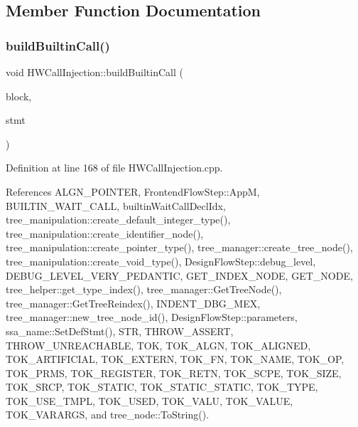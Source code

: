 \subsection{Member Function Documentation}
\mbox{\label{classHWCallInjection_a384a02ea581f0406948fe6823fe35b8a}} 
\subsubsection{\texorpdfstring{build\+Builtin\+Call()}{buildBuiltinCall()}}
{\footnotesize\ttfamily void H\+W\+Call\+Injection\+::build\+Builtin\+Call (\begin{DoxyParamCaption}\item[{const bloc\+Ref}]{block,  }\item[{const \hyperlink{tree__node_8hpp_a6ee377554d1c4871ad66a337eaa67fd5}{tree\+\_\+node\+Ref}}]{stmt }\end{DoxyParamCaption})\hspace{0.3cm}{\ttfamily [private]}}



Definition at line 168 of file H\+W\+Call\+Injection.\+cpp.



References A\+L\+G\+N\+\_\+\+P\+O\+I\+N\+T\+ER, Frontend\+Flow\+Step\+::\+AppM, B\+U\+I\+L\+T\+I\+N\+\_\+\+W\+A\+I\+T\+\_\+\+C\+A\+LL, builtin\+Wait\+Call\+Decl\+Idx, tree\+\_\+manipulation\+::create\+\_\+default\+\_\+integer\+\_\+type(), tree\+\_\+manipulation\+::create\+\_\+identifier\+\_\+node(), tree\+\_\+manipulation\+::create\+\_\+pointer\+\_\+type(), tree\+\_\+manager\+::create\+\_\+tree\+\_\+node(), tree\+\_\+manipulation\+::create\+\_\+void\+\_\+type(), Design\+Flow\+Step\+::debug\+\_\+level, D\+E\+B\+U\+G\+\_\+\+L\+E\+V\+E\+L\+\_\+\+V\+E\+R\+Y\+\_\+\+P\+E\+D\+A\+N\+T\+IC, G\+E\+T\+\_\+\+I\+N\+D\+E\+X\+\_\+\+N\+O\+DE, G\+E\+T\+\_\+\+N\+O\+DE, tree\+\_\+helper\+::get\+\_\+type\+\_\+index(), tree\+\_\+manager\+::\+Get\+Tree\+Node(), tree\+\_\+manager\+::\+Get\+Tree\+Reindex(), I\+N\+D\+E\+N\+T\+\_\+\+D\+B\+G\+\_\+\+M\+EX, tree\+\_\+manager\+::new\+\_\+tree\+\_\+node\+\_\+id(), Design\+Flow\+Step\+::parameters, ssa\+\_\+name\+::\+Set\+Def\+Stmt(), S\+TR, T\+H\+R\+O\+W\+\_\+\+A\+S\+S\+E\+RT, T\+H\+R\+O\+W\+\_\+\+U\+N\+R\+E\+A\+C\+H\+A\+B\+LE, T\+OK, T\+O\+K\+\_\+\+A\+L\+GN, T\+O\+K\+\_\+\+A\+L\+I\+G\+N\+ED, T\+O\+K\+\_\+\+A\+R\+T\+I\+F\+I\+C\+I\+AL, T\+O\+K\+\_\+\+E\+X\+T\+E\+RN, T\+O\+K\+\_\+\+FN, T\+O\+K\+\_\+\+N\+A\+ME, T\+O\+K\+\_\+\+OP, T\+O\+K\+\_\+\+P\+R\+MS, T\+O\+K\+\_\+\+R\+E\+G\+I\+S\+T\+ER, T\+O\+K\+\_\+\+R\+E\+TN, T\+O\+K\+\_\+\+S\+C\+PE, T\+O\+K\+\_\+\+S\+I\+ZE, T\+O\+K\+\_\+\+S\+R\+CP, T\+O\+K\+\_\+\+S\+T\+A\+T\+IC, T\+O\+K\+\_\+\+S\+T\+A\+T\+I\+C\+\_\+\+S\+T\+A\+T\+IC, T\+O\+K\+\_\+\+T\+Y\+PE, T\+O\+K\+\_\+\+U\+S\+E\+\_\+\+T\+M\+PL, T\+O\+K\+\_\+\+U\+S\+ED, T\+O\+K\+\_\+\+V\+A\+LU, T\+O\+K\+\_\+\+V\+A\+L\+UE, T\+O\+K\+\_\+\+V\+A\+R\+A\+R\+GS, and tree\+\_\+node\+::\+To\+String().



